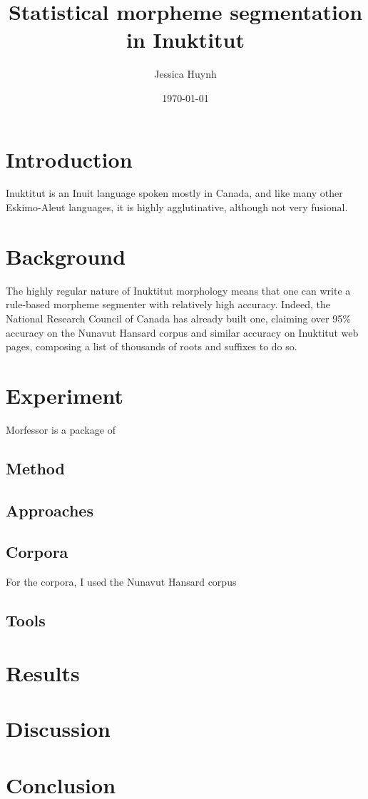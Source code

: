 \documentclass[10pt]{article}
\title{Statistical morpheme segmentation in Inuktitut}
\author{Jessica Huynh}
\date{\today}
\begin{document}
	
\maketitle

\onehalfspacing

\section{Introduction}
Inuktitut is an Inuit language spoken mostly in Canada, and like many other Eskimo-Aleut languages, it is highly agglutinative, although not very fusional.\cite{syllabics}

\section{Background}
The highly regular nature of Inuktitut morphology means that one can write a rule-based morpheme segmenter with relatively high accuracy. Indeed, the National Research Council of Canada has already built one, claiming over 95\% accuracy on the Nunavut Hansard corpus and similar accuracy on Inuktitut web pages, composing a list of thousands of roots and suffixes to do so.\cite{analyzer}

\section{Experiment}
Morfessor\cite{morfessor} is a package of 

\subsection{Method}
\cite{morfessor}

\subsection{Approaches}

\subsection{Corpora}
For the corpora, I used the Nunavut Hansard corpus\cite{hansard}

\subsection{Tools}

\section{Results}

\section{Discussion}

\section{Conclusion}

\pagebreak


\end{document}
